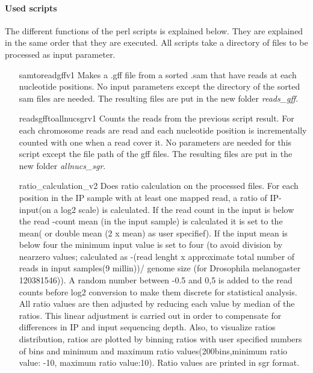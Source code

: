 \paragraph{Used scripts}
The different functions of the perl scripts is explained below. They are explained in the same order that they are executed. All scripts take a directory of files to be processed as input parameter.

\begin{itemize}
\item[samtoreadgffv1] Makes a .gff file from a sorted .sam that have reads at each nucleotide positions. No input parameters except the directory of the sorted sam files are needed. The resulting files are put in the new folder \textit{reads\_gff}.

\item[readsgfftoallnucsgrv1]  Counts the reads from the previous script result. For each chromosome reads are read and each nucleotide position is incrementally counted with one when a read cover it. No parameters are needed for this script except the file path of the gff files. The resulting files are put in the new folder \textit{allnucs\_sgr}.

\item[ratio\_calculation\_v2] Does ratio calculation on the processed files. For each position in the IP sample with at least one mapped read, a ratio of IP-input(on a log2 scale) is calculated. If the read count in the input is below the read -count mean (in the input sample) is calculated it is set to the mean( or double mean (2 x mean) as user specifief). If the input mean is below four the minimum input value is set to four (to avoid division by nearzero values; calculated as -(read lenght x approximate total number of reads in input samples(9 millin))/ genome size (for Drosophila melanogaster 120381546)). A random number between -0.5 and 0,5 is added to the read counts before log2 conversion to make them discrete for statistical analysis. All ratio values are then adjusted by reducing each value by median of the ratios. This linear adjustment is carried out in order to compensate for differences in IP and input sequencing depth. Also, to visualize ratios distribution, ratios are plotted by binning ratios with user specified numbers of bins and minimum and maximum ratio values(200bins,minimum ratio value: -10, maximum ratio value:10). Ratio values are printed in sgr format.
 

\end{itemize}

